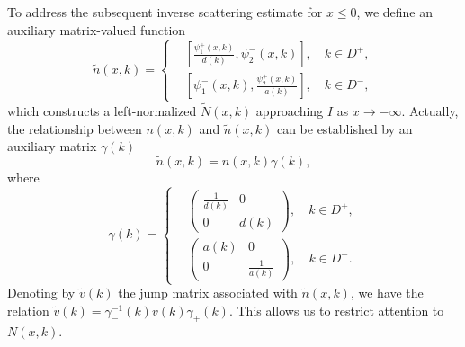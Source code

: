 \documentclass[preprint,compress,12pt]{elsarticle}
\numberwithin{equation}{section}
\begin{document}
To address the subsequent inverse scattering estimate for $x\leq0$, we define an auxiliary matrix-valued function
\begin{equation}\label{au1}
\widetilde{n}(x,k)=\left\{
\begin{aligned}
&\left[\frac{\psi_{1}^{+}(x,k)}{d(k)},\psi_{2}^{-}(x,k)\right],\quad k\in D^{+},\\
&\left[\psi_{1}^{-}(x,k),\frac{\psi_{2}^{+}(x,k)}{a(k)}\right],\quad k\in D^{-},
\end{aligned}
\right.
\end{equation}
which constructs a left-normalized $\widetilde{N}(x,k)$ approaching $I$ as $x\rightarrow -\infty$. Actually, the relationship between $n(x,k)$ and $\widetilde{n}(x,k)$ can be established by an auxiliary matrix $\gamma(k)$
\begin{equation}\label{au2}
\widetilde{n}(x,k)=n(x,k)\gamma(k),
\end{equation}
where
\begin{equation*}
\gamma(k)=\left\{
\begin{aligned}
&\begin{pmatrix}\frac{1}{d(k)}&0\\0&d(k)\end{pmatrix},\quad k\in D^{+}, \\
&\begin{pmatrix}a(k)&0\\0&\frac{1}{a(k)}\end{pmatrix},\quad k\in D^{-}.
\end{aligned}
\right.
\end{equation*}
Denoting by $\widetilde{v}(k)$ the jump matrix associated with $\widetilde{n}(x,k)$, we have the relation $\widetilde{v}(k)=\gamma_{-}^{-1}(k)v(k)\gamma_{+}(k)$. This allows us to restrict attention to $N(x,k)$.
\end{document}
